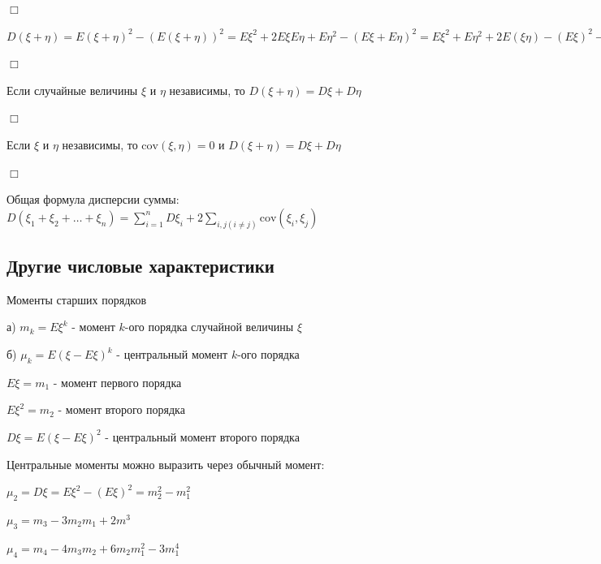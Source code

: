 \documentclass[12pt]{article}
\begin{document}
    \begin{MyProof}
        $\Box$

    $D(\xi + \eta) = E(\xi + \eta)^2 - (E(\xi + \eta))^2 = E\xi^2 + 2E\xi E\eta + E\eta^2 - (E\xi + E\eta)^2 =
    E\xi^2 + E\eta^2 + 2E(\xi\eta) - (E\xi)^2 - (E\eta)^2 - 2E\xi E\eta = D\xi + D\eta + 2\mathrm{cov}(\xi, \eta)$

        $\Box$
    \end{MyProof}


    \begin{MyTheorem}
         Если случайные величины $\xi$ и $\eta$ независимы, то $D(\xi + \eta) = D\xi + D\eta$
    \end{MyTheorem}

    \begin{MyProof}
        $\Box$

        Если $\xi$ и $\eta$ независимы, то $\mathrm{cov}(\xi, \eta) = 0$ и $D(\xi + \eta) = D\xi + D\eta$

        $\Box$
    \end{MyProof}

    \begin{MyTheorem}
         Общая формула дисперсии суммы: $D(\xi_1 + \xi_2 + \dots + \xi_n) = \sum_{i = 1}^n D \xi_i + 2\sum_{i, j (i \neq j)} \mathrm{cov} (\xi_i, \xi_j)$
    \end{MyTheorem}

    \subsection{Другие числовые характеристики}

    Моменты старших порядков

    а) $m_k = E\xi^k$ - момент $k$-ого порядка случайной величины $\xi$

    б) $\mu_k = E(\xi - E\xi)^k$ - центральный момент $k$-ого порядка

    $E\xi = m_1$ - момент первого порядка

    $E\xi^2 = m_2$ - момент второго порядка

    $D\xi = E(\xi - E\xi)^2$ - центральный момент второго порядка

    \Nota Центральные моменты можно выразить через обычный момент:

    $\mu_2 = D\xi = E\xi^2 - (E\xi)^2 = m_2^2 - m_1^2$

    $\mu_3 = m_3 - 3m_2 m_1 + 2m^3$

    $\mu_4 = m_4 - 4m_3 m_2 + 6m_2 m_1^2 - 3m_1^4$
\end{document}
